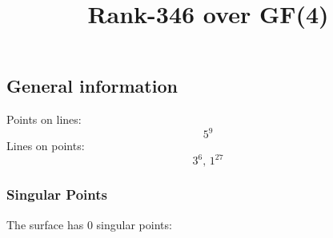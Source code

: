 \documentclass{article}
\newcommand\setTBstruts{\def\T{\rule{0pt}{2.6ex}}%
\def\B{\rule[-1.2ex]{0pt}{0pt}}}
\begin{document}
 
\setTBstruts



{\allowdisplaybreaks%






\title{Rank-346 over GF(4)}
\author{}%
\maketitle%
%
{}



\subsection*{General information}
Points on lines:
$$
5^9$$
Lines on points:
$$
3^6,\,1^{27}$$
\subsubsection*{Singular Points}
The surface has 0 singular points:\\
\begin{align*}
\end{align*}
}
\end{document}

